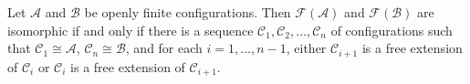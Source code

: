 Let $\mathcal{A}$ and $\mathcal{B}$ be openly finite configurations. Then $\mathcal{F}(\mathcal{A})$ and $\mathcal{F}(\mathcal{B})$ are isomorphic if and only if there is a sequence $\mathcal{C}_1, \mathcal{C}_2, \ldots, \mathcal{C}_n$ of configurations such that $\mathcal{C}_1 \cong \mathcal{A}$, $\mathcal{C}_n \cong \mathcal{B}$, and for each $i = 1, \ldots, n-1$, either $\mathcal{C}_{i+1}$ is a free extension of $\mathcal{C}_i$ or $\mathcal{C}_i$ is a free extension of $\mathcal{C}_{i+1}$.
